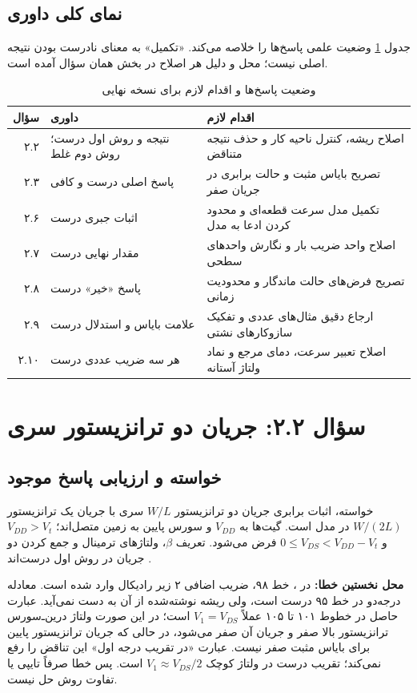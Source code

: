 \documentclass[12pt,a4paper]{article}
\newcommand{\exnum}[1]{\mbox{\beginL#1\endL}}
\newcommand{\reviewfile}[1]{\lr{\small\texttt{#1}}}
\begin{document}
\subsection*{نمای کلی داوری}
جدول \ref{tab:verdict} وضعیت علمی پاسخ‌ها را خلاصه می‌کند. «تکمیل» به معنای نادرست بودن نتیجه اصلی نیست؛ محل و دلیل هر اصلاح در بخش همان سؤال آمده است.
\begin{table}[!htbp]
\centering
\caption{وضعیت پاسخ‌ها و اقدام لازم برای نسخه نهایی}
\label{tab:verdict}
\begin{tabularx}{\textwidth}{@{}r X X@{}}
\toprule
سؤال & داوری & اقدام لازم \\
\midrule
\exnum{۲.۲} & نتیجه و روش اول درست؛ روش دوم غلط & اصلاح ریشه، کنترل ناحیه کار و حذف نتیجه متناقض \\
\exnum{۲.۳} & پاسخ اصلی درست و کافی & تصریح بایاس مثبت و حالت برابری در جریان صفر \\
\exnum{۲.۶} & اثبات جبری درست & تکمیل مدل سرعت قطعه‌ای و محدود کردن ادعا به مدل \\
\exnum{۲.۷} & مقدار نهایی درست & اصلاح واحد ضریب بار و نگارش واحدهای سطحی \\
\exnum{۲.۸} & پاسخ «خیر» درست & تصریح فرض‌های حالت ماندگار و محدودیت زمانی \\
\exnum{۲.۹} & علامت بایاس و استدلال درست & ارجاع دقیق مثال‌های عددی و تفکیک سازوکارهای نشتی \\
\exnum{۲.۱۰} & هر سه ضریب عددی درست & اصلاح تعبیر سرعت، دمای مرجع و نماد ولتاژ آستانه \\
\bottomrule
\end{tabularx}
\end{table}

\section*{سؤال \exnum{۲.۲}: جریان دو ترانزیستور سری}
\subsection*{خواسته و ارزیابی پاسخ موجود}
خواسته، اثبات برابری جریان دو ترانزیستور \(W/L\) سری با جریان یک ترانزیستور \(W/(2L)\) در مدل  است. گیت‌ها به \(V_{DD}\) و سورس پایین به زمین متصل‌اند؛ \(V_{DD}>V_t\) و \(0\le V_{DS}<V_{DD}-V_t\) فرض می‌شود. تعریف \(\beta\)، ولتاژهای ترمینال و جمع کردن دو جریان در روش اول درست‌اند \cite[شکل \exnum{۲.۳۲}، صفحه چاپی ۹۵؛ روابط \exnum{۲.۵} تا \exnum{۲.۸}، صفحه چاپی ۶۶]{weste}.

\textbf{محل نخستین خطا:} در \reviewfile{2/solutions/2-2.tex}، خط ۹۸، ضریب اضافی ۲ زیر رادیکال وارد شده است. معادله درجه‌دو در خط ۹۵ درست است، ولی ریشه نوشته‌شده از آن به دست نمی‌آید. عبارت حاصل در خطوط ۱۰۱ تا ۱۰۵ عملاً \(V_1=V_{DS}\) است؛ در این صورت ولتاژ درین‌ـ‌سورس ترانزیستور بالا صفر و جریان آن صفر می‌شود، در حالی که جریان ترانزیستور پایین برای بایاس مثبت صفر نیست. عبارت «در تقریب درجه اول» این تناقض را رفع نمی‌کند؛ تقریب درست در ولتاژ کوچک \(V_1\approx V_{DS}/2\) است. پس خطا صرفاً تایپی یا تفاوت روش حل نیست.
\end{document}
